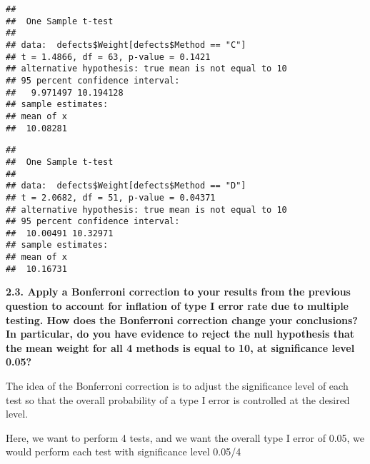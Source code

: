 \documentclass[
]{article}
\newenvironment{Shaded}{\begin{snugshade}}{\end{snugshade}}
\newcommand{\AttributeTok}[1]{\textcolor[rgb]{0.77,0.63,0.00}{#1}}
\newcommand{\DecValTok}[1]{\textcolor[rgb]{0.00,0.00,0.81}{#1}}
\newcommand{\FunctionTok}[1]{\textcolor[rgb]{0.00,0.00,0.00}{#1}}
\newcommand{\NormalTok}[1]{#1}
\newcommand{\SpecialCharTok}[1]{\textcolor[rgb]{0.00,0.00,0.00}{#1}}
\newcommand{\StringTok}[1]{\textcolor[rgb]{0.31,0.60,0.02}{#1}}
\begin{document}
\begin{Shaded}
\end{Shaded}

\begin{verbatim}
## 
##  One Sample t-test
## 
## data:  defects$Weight[defects$Method == "C"]
## t = 1.4866, df = 63, p-value = 0.1421
## alternative hypothesis: true mean is not equal to 10
## 95 percent confidence interval:
##   9.971497 10.194128
## sample estimates:
## mean of x 
##  10.08281
\end{verbatim}

\begin{Shaded}
\end{Shaded}

\begin{verbatim}
## 
##  One Sample t-test
## 
## data:  defects$Weight[defects$Method == "D"]
## t = 2.0682, df = 51, p-value = 0.04371
## alternative hypothesis: true mean is not equal to 10
## 95 percent confidence interval:
##  10.00491 10.32971
## sample estimates:
## mean of x 
##  10.16731
\end{verbatim}

\textbf{2.3. Apply a Bonferroni correction to your results from the
previous question to account for inflation of type I error rate due to
multiple testing. How does the Bonferroni correction change your
conclusions? In particular, do you have evidence to reject the null
hypothesis that the mean weight for all 4 methods is equal to 10, at
significance level 0.05?}

The idea of the Bonferroni correction is to adjust the significance
level of each test so that the overall probability of a type I error is
controlled at the desired level.

Here, we want to perform 4 tests, and we want the overall type I error
of 0.05, we would perform each test with significance level 0.05/4
\end{document}
